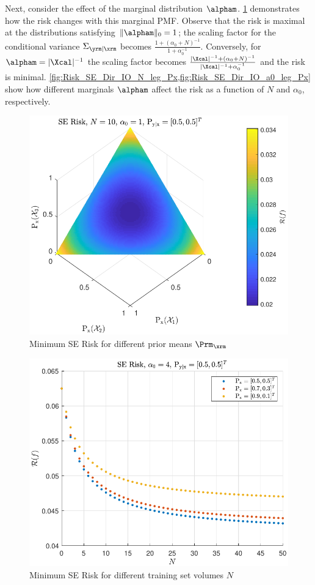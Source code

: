 \documentclass[12pt]{report}
\begin{document}
Next, consider the effect of the marginal distribution $\alpham$. \cref{fig:Risk_SE_Dir_IO_Px_N_10_a0_1} demonstrates how the risk changes with this marginal PMF. Observe that the risk is maximal at the distributions satisfying $\| \alpham \|_0 = 1$; the scaling factor for the conditional variance $\Sigma_{\yrm | \xrm}$ becomes $\frac{1 + (\alpha_0+N)^{-1}}{1 + \alpha_0^{-1}}$. Conversely, for $\alpham = |\Xcal|^{-1}$ the scaling factor becomes $\frac{|\Xcal|^{-1} + (\alpha_0+N)^{-1}}{|\Xcal|^{-1} + \alpha_0^{-1}}$ and the risk is minimal. \cref{fig:Risk_SE_Dir_IO_N_leg_Px,fig:Risk_SE_Dir_IO_a0_leg_Px} show how different marginals $\alpham$ affect the risk as a function of $N$ and $\alpha_0$, respectively.

\begin{figure}
\centering
\includegraphics[width=0.7\linewidth]{Risk_SE_Dir_IO_Px_N_10_a0_1.pdf}
\caption{Minimum SE Risk for different prior means $\Prm_{\xrm}$}
\label{fig:Risk_SE_Dir_IO_Px_N_10_a0_1}
\end{figure}

\begin{figure}
\centering
\includegraphics[width=0.7\linewidth]{Risk_SE_Dir_IO_N_leg_Px.pdf}
\caption{Minimum SE Risk for different training set volumes $N$}
\label{fig:Risk_SE_Dir_IO_N_leg_Px}
\end{figure}
\end{document}
